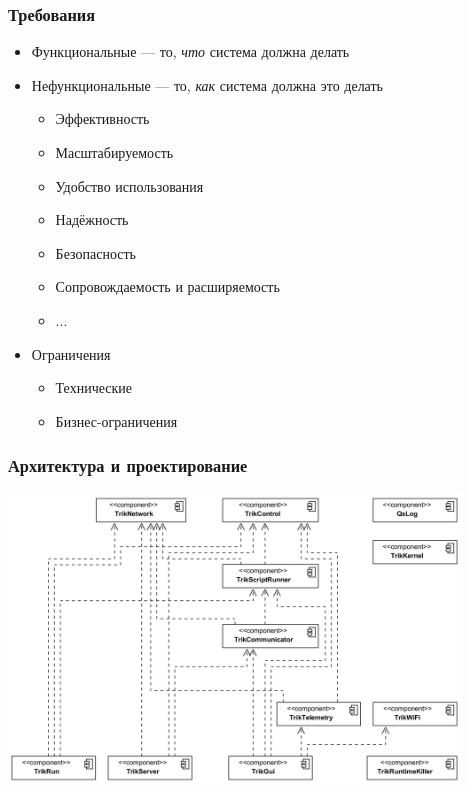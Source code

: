 \documentclass{../slides-style}
\begin{document}
    \begin{frame}
        \frametitle{Требования}
        \begin{itemize}
            \item Функциональные --- то, \emph{что} система должна делать
            \item Нефункциональные --- то, \emph{как} система должна это делать
            \begin{itemize}
                \item Эффективность
                \item Масштабируемость
                \item Удобство использования
                \item Надёжность
                \item Безопасность
                \item Сопровождаемость и расширяемость
                \item ...
            \end{itemize}
            \item Ограничения
            \begin{itemize}
                \item Технические
                \item Бизнес-ограничения
            \end{itemize}
        \end{itemize}
    \end{frame}

    \begin{frame}
        \frametitle{Архитектура и проектирование}
        \begin{center}
            \includegraphics[width=0.9\textwidth]{trikRuntimeComponents.png}
        \end{center}
    \end{frame}
\end{document}
